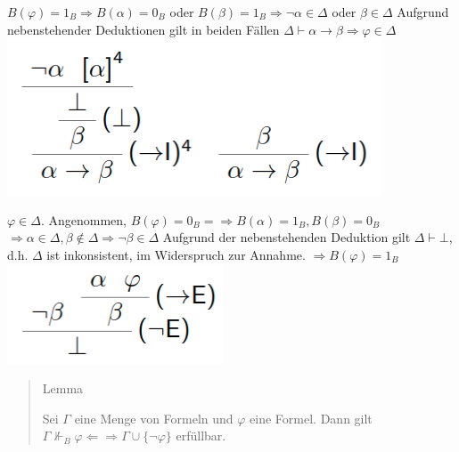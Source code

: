\documentclass[a4paper]{article}
\begin{document}
\begin{multicols}{3}
  \begin{itemize*}
    \itemsep1pt\parskip0pt
    \item
          $B(\varphi) = 1_B \Rightarrow B(\alpha) = 0_B$ oder
          $B(\beta) = 1_B \Rightarrow\lnot\alpha\in\Delta$ oder $\beta\in\Delta$
          Aufgrund nebenstehender Deduktionen gilt in beiden Fällen
          $\Delta\vdash\alpha\rightarrow\beta\Rightarrow\varphi\in\Delta$
          \includegraphics[width=\linewidth]{Assets/Logik-beispiel-9.png}
    \item
          $\varphi\in\Delta$. Angenommen,
          $B(\varphi) = 0_B = \Rightarrow B(\alpha) = 1_B, B(\beta) = 0_B$
          $\Rightarrow\alpha\in\Delta, \beta\not\in\Delta \Rightarrow \lnot\beta\in\Delta$
          Aufgrund der nebenstehenden Deduktion gilt $\Delta\vdash\bot$, d.h.
          $\Delta$ ist inkonsistent, im Widerspruch zur Annahme.
          $\Rightarrow B(\varphi) = 1_B$
          \includegraphics[width=\linewidth]{Assets/Logik-beispiel-10.png}
  \end{itemize*}

  \begin{quote}
    Lemma

    Sei $\Gamma$ eine Menge von Formeln und $\varphi$ eine Formel. Dann gilt
    $\Gamma\not\Vdash_B\varphi\Leftarrow\Rightarrow\Gamma\cup\{\lnot \varphi\}$
    erfüllbar.
  \end{quote}


\end{multicols}
\end{document}
